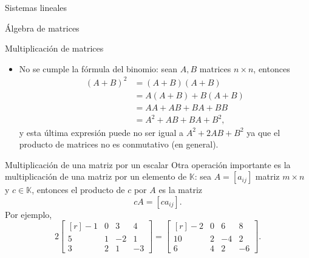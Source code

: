 \documentclass[a4paper,12pt,twoside,spanish,reqno]{amsbook}
\theoremstyle{definition}
\theoremstyle{remark}
\newcommand{\K}{\mathbb K}
\begin{document}
\begin{chapter}{Sistemas lineales}
\begin{section}{Álgebra de matrices}
\begin{subsection}{Multiplicación de matrices}
\begin{itemize}
                    \item No se cumple la fórmula del binomio: 	sean $A, B$ matrices $n \times n$, entonces		
                    \begin{align*}
                    (A+B)^2 &= (A+B)(A+B) \\&= A(A+B) + B(A+B) \\&= AA + AB + BA + BB \\&= A^2 + AB + BA + B^2,
                    \end{align*}
                    y  esta última expresión puede no ser  igual a $A^2 + 2AB + B^2$ ya que el producto de matrices no es conmutativo (en general). 
                \end{itemize}
            \end{subsection}
        
        
        \begin{subsection}{Multiplicación de una matriz por un escalar} Otra operación importante es la multiplicación de una matriz por un elemento de $\K$: sea $A=[a_{ij}]$ matriz $m \times n$ y $c \in \K$,  entonces el producto de $c$ por $A$ es la matriz
            $$
            cA=[ca_{ij}].
            $$ 
        Por ejemplo, 
        $$
        2\begin{bmatrix*}[r]
        -1& 0& 3 & 4\\
        5& 1& -2 & 1\\
        3& 2& 1 & -3
        \end{bmatrix*} =
        \begin{bmatrix*}[r]
        -2& 0& 6& 8\\
        10& 2& -4 & 2\\
        6& 4& 2 & -6
        \end{bmatrix*}.
        $$
        

\end{subsection}
\end{section}
\end{chapter}
\end{document}
